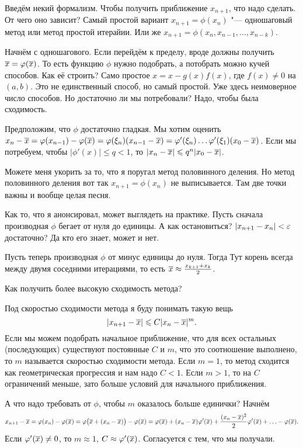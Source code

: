 Введём некий формализм. Чтобы получить приближение $x_{n+1}$, что надо сделать. От чего оно зависит? Самый простой вариант $x_{n+1} = \phi(x_n)$ "--- одношаговый метод или метод простой итерайии. Или же $x_{n+1} = \phi(x_n,x_{n-1},\dots,x_{n-k})$.

Начнём с одношагового. Если перейдём к пределу, вроде должны получить $\overline{x} = \varphi(\overline{x})$. То есть функцию $\phi$ нужно подобрать, а потобрать можно кучей способов. Как её строить? Само простое $x = x - g(x)f(x)$, где $f(x)\ne 0$ на $(a,b)$. Это не единственный способ, но самый простой. Уже здесь неимоверное число способов. Но достаточно ли мы потребовали? Надо, чтобы была сходимость.

Предположим, что $\phi$ достаточно гладкая. Мы хотим оценить $x_n-\ol x = \phi(x_{n-1}) - \phi(\ol x) = \phi(\xi_n) (x_{n-1} - \ol x) \hm= \phi'(\xi_n)\dots\phi'(\xi_1) (x_0-\ol x)$.
Если мы потребуем, чтобы $\big|\phi'(x)\big|\le q<1$, то $|x_n-\overline{x}| \leqslant q^n |x_0-\overline{x}|$.

Можете меня укорить за то, что я поругал метод половинного деления. Но метод половинного деления вот так $x_{n+1} = \phi(x_n)$ не выписывается. Там две точки важны и вообще целая песня.

Как то, что я анонсировал, может выглядеть на практике. Пусть сначала производная $\phi$ бегает от нуля до единицы.
А как остановиться? $|x_{n+1}-x_{n}|<\varepsilon$ достаточно? Да кто его знает, может и нет. 

Пусть теперь производная $\phi$ от минус единицы до нуля. Тогда
Тут корень всегда между двумя соседними итерациями, то есть $\overline{x} \approx \frac{x_{k+1} + x_k}2$.

Как получить более высокую сходимость метода?

Под скоростью сходимости метода я буду понимать такую вещь
\[
  |x_{n+1} - \overline{x}| \leqslant C |x_n - \overline{x}|^m.
\]
Если мы можем подобрать начальное приближение, что для всех остальных (последующих) существуют постоянные $C$ и $m$, что это соотношение выполнено, то $m$ называется скоростью сходимости метода. Если $m=1$, то метод сходится как геометрическая прогрессия и нам надо $C<1$. Если $m>1$, то на $C$ ограничений меньше, зато больше условий для начального приближения.

А что надо требовать от $\phi$, чтобы $m$ оказалось больше единички? Начнём
\[
  x_{n+1} - \overline{x} = \varphi(x_n) - \varphi(\overline{x}) = \varphi\big(\overline{x} + (x_n - \overline{x})\big) - \varphi(\overline{x}) = 
  \varphi(\overline{x}) + (x_n - \overline{x})\varphi'(\overline{x}) + \frac{(x_n-\overline{x})^2}2\varphi'(\overline{x}) + \ldots - \varphi(\overline{x}).
\]
Если $\varphi'(\overline{x})\ne 0$, то $m\approx 1$, $C\approx \varphi'(\overline{x})$. Согласуется с тем, что мы получали.

